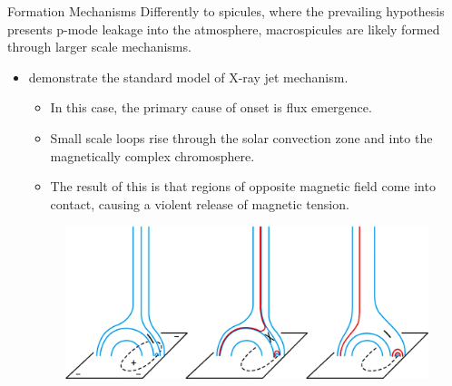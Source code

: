 \documentclass{beamer}
\begin{document}
	\begin{frame}{Formation Mechanisms}
		Differently to spicules, where the prevailing hypothesis presents p-mode leakage into the atmosphere, macrospicules are likely formed through larger scale mechanisms.
		\begin{itemize}
			\item{\cite{Shibata1992} demonstrate the standard model of X-ray jet mechanism.}
			\begin{itemize}
				\item{In this case, the primary cause of onset is flux emergence.}
				\item{Small scale loops rise through the solar convection zone and into the magnetically complex chromosphere.}
				\item{The result of this is that regions of opposite magnetic field come into contact, causing a violent release of magnetic tension.}
			\end{itemize}
			\begin{figure}
				\includegraphics[scale=0.2]{Figs/inverted_Y.png}
				\caption{\cite{Moore2010}}
			\end{figure}
		\end{itemize}
	\end{frame}
\end{document}
